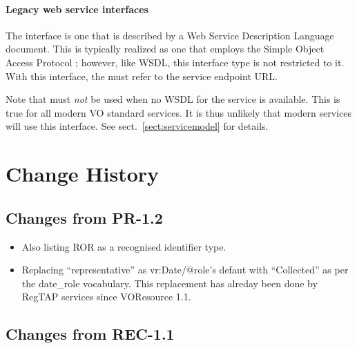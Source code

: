 \documentclass[11pt,a4paper]{ivoa}
\begin{document}

\paragraph{Legacy web service interfaces}

The  interface is one that is described by a Web
Service Description Language \citep{booth07} document. This is typically
realized as one that employs the Simple Object Access Protocol
\citep{std:SOAP}; however, like WSDL, this interface type is not
restricted to it. With this interface, the  must
refer to the service endpoint URL.

Note that  must \emph{not} be used when no WSDL for
the service is available.  This is true for all modern VO standard
services.  It is thus unlikely that modern services will use this
interface.  See sect.~\ref{sect:servicemodel} for details.

\appendix

\section{Change History}

\subsection{Changes from PR-1.2}

\begin{itemize}
\item Also listing ROR as a recognised identifier type.
\item Replacing ``representative'' as vr:Date/@role's defaut with
``Collected'' as per the date\_role vocabulary.  This replacement has
alreday been done by RegTAP services since VOResource 1.1.
\end{itemize}

\subsection{Changes from REC-1.1}
\end{document}
